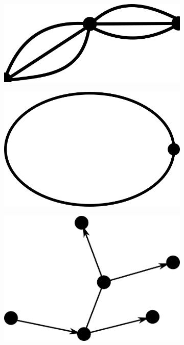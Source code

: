 \begin{figure}[!ht]
\begin{subfigure}{.25\textwidth}
    \caption{}
    \label{f:graph_sample_2}
  \end{subfigure}
  \begin{subfigure}{.25\textwidth}
    \centering
    \includegraphics[width=.8\linewidth]{images/lab3/graph_sample_3.png}
    \caption{}
    \label{f:graph_sample_3}
  \end{subfigure}
  \begin{subfigure}{.25\textwidth}
    \centering
    \includegraphics[width=.8\linewidth]{images/lab3/graph_sample_4.png}
    \caption{}
    \label{f:graph_sample_4}
  \end{subfigure}
  \begin{subfigure}{.25\textwidth}
    \centering
    \includegraphics[width=.8\linewidth]{images/lab3/graph_sample_5.png}

\end{subfigure}
\end{figure}
